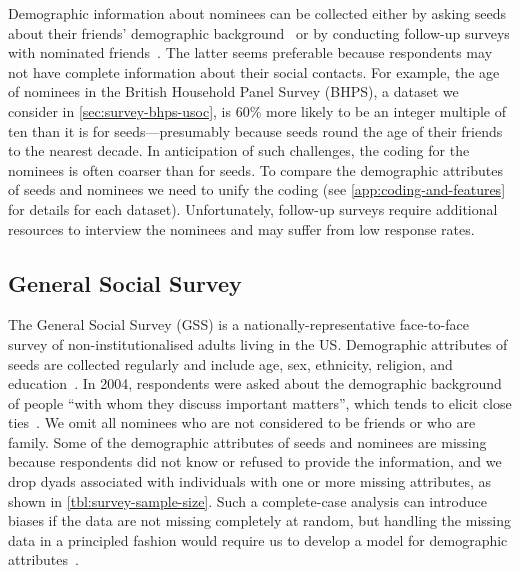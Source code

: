 \documentclass{scrartcl}
\begin{document}
\begin{refsection}
Demographic information about nominees can be collected either by asking seeds about their friends' demographic background~\cite{Marsden1987,McPherson2006} or by conducting follow-up surveys with nominated friends~\cite{Johnson1989}. The latter seems preferable because respondents may not have complete information about their social contacts. For example, the age of nominees in the British Household Panel Survey (BHPS), a dataset we consider in \cref{sec:survey-bhps-usoc}, is 60\% more likely to be an integer multiple of ten than it is for seeds---presumably because seeds round the age of their friends to the nearest decade. In anticipation of such challenges, the coding for the nominees is often coarser than for seeds. To compare the demographic attributes of seeds and nominees we need to unify the coding (see \cref{app:coding-and-features} for details for each dataset). Unfortunately, follow-up surveys require additional resources to interview the nominees and may suffer from low response rates.

\subsection{General Social Survey\label{sec:survey-gss}}

The General Social Survey (GSS) is a nationally-representative face-to-face survey of non-institutionalised adults living in the US. Demographic attributes of seeds are collected regularly and include age, sex, ethnicity, religion, and education~\cite{Marsden1987,Marsden1988}. In 2004, respondents were asked about the demographic background of people ``with whom they discuss important matters'', which tends to elicit close ties~\cite{Marin2004}. We omit all nominees who are not considered to be friends or who are family. Some of the demographic attributes of seeds and nominees are missing because respondents did not know or refused to provide the information, and we drop dyads associated with individuals with one or more missing attributes, as shown in \cref{tbl:survey-sample-size}. Such a complete-case analysis can introduce biases if the data are not missing completely at random, but handling the missing data in a principled fashion would require us to develop a model for demographic attributes~\cite{Pigott2001}.


\end{refsection}
\end{document}

